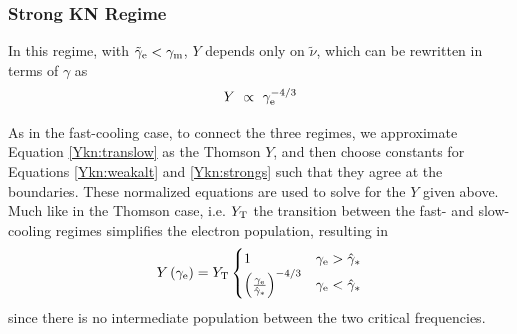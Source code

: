 \documentclass[fleqn,usenatbib]{mnras}
\begin{document}
\subsubsection{Strong KN Regime}

In this regime, with $\tilde{\gamma}_{\rm{e}} < \gamma_{\rm{m}}$, $Y$ depends only on $\tilde{\nu}$, which can be rewritten in terms of $\gamma$ as
\begin{equation}
\label{Ykn:strongs}
    Y \ \propto \ \gamma_{\rm e}^{-4/3}
\end{equation}

As in the fast-cooling case, to connect the three regimes, we approximate Equation \ref{Ykn:translow} as the Thomson $Y$, and then choose constants for Equations \ref{Ykn:weakalt} and \ref{Ykn:strongs} such that they agree at the boundaries. These normalized equations are used to solve for the $Y$ given above. Much like in the Thomson case, i.e. $Y_{\rm{T}}$ the transition between the fast- and slow-cooling regimes simplifies the electron population, resulting in 
\begin{equation}
\label{Ykn:tranfs}
Y\left(\gamma_{\rm e}\right) = Y_{\rm T} \begin{cases} 
      1 & \gamma_{\rm e} > \hat{\gamma}_*\\
      \left(\frac{\gamma_{\rm e}}{\hat{\gamma}_{*}}\right)^{-4/3}& \gamma_{\rm e} < \hat{\gamma}_*\\
   \end{cases}
\end{equation}
since there is no intermediate population between the two critical frequencies.




% 

\label{lastpage}
\end{document}
